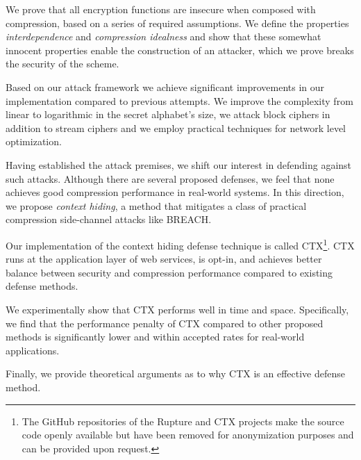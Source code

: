 We prove that all encryption functions are insecure when composed with
compression, based on a series of required assumptions. We define the properties
\textit{interdependence} and \textit{compression idealness} and show that these
somewhat innocent properties enable the construction of an attacker, which we
prove breaks the security of the scheme.

Based on our attack framework we achieve significant improvements in our
implementation compared to previous attempts. We improve the complexity from
linear to logarithmic in the secret alphabet's size, we attack block ciphers in
addition to stream ciphers and we employ practical techniques for network level
optimization.

Having established the attack premises, we shift our interest in defending
against such attacks. Although there are several proposed defenses, we feel that
none achieves good compression performance in real-world systems. In this
direction, we propose \textit{context hiding}, a method that mitigates a class
of practical compression side-channel attacks like BREACH.

Our implementation of the context hiding defense technique is called
CTX\footnote[1]{The GitHub repositories of the Rupture and CTX projects make the
source code openly available but have been removed for anonymization purposes
and can be provided upon request.}. CTX runs at the application layer of web
services, is opt-in, and achieves better balance between security and
compression performance compared to existing defense methods.

We experimentally show that CTX performs well in time and space. Specifically,
we find that the performance penalty of CTX compared to other proposed methods
is significantly lower and within accepted rates for real-world applications.

Finally, we provide theoretical arguments as to why CTX is an effective defense
method.
